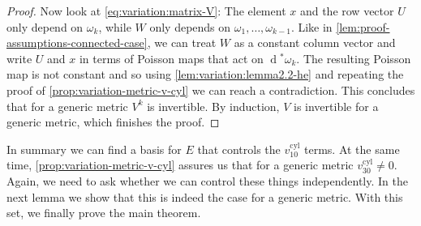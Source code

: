 \documentclass[preprint,12pt]{elsarticle}
\numberwithin{table}{section}
\renewcommand{\d}{\operatorname{d}\!}
\begin{document}
\begin{proof}
	Now look at \cref{eq:variation:matrix-V}: The element $x$ and the row vector $U$ only depend on $\omega_k$, while $W$ only depends on $\omega_1, \ldots, \omega_{k-1}$. Like in \cref{lem:proof-assumptions-connected-case}, we can treat $W$ as a constant column vector and write $U$ and $x$ in terms of Poisson maps that act on $\d^* \omega_k$. The resulting Poisson map is not constant and so using \cref{lem:variation:lemma2.2-he} and repeating the proof of \cref{prop:variation-metric-v-cyl} we can reach a contradiction. This concludes that for a generic metric $V^k$ is invertible. 
	By induction, $V$ is invertible for a generic metric, which finishes the proof.
\end{proof}

In summary we can find a basis for $E$ that controls the $v^{\mathrm{cyl}}_{10}$ terms. At the same time, \cref{prop:variation-metric-v-cyl} assures us that for a generic metric $v^{\mathrm{cyl}}_{30} \not = 0$. Again, we need to ask whether we can control these things independently. In the next lemma we show that this is indeed the case for a generic metric. With this set, we finally prove the main theorem.
\end{document}
